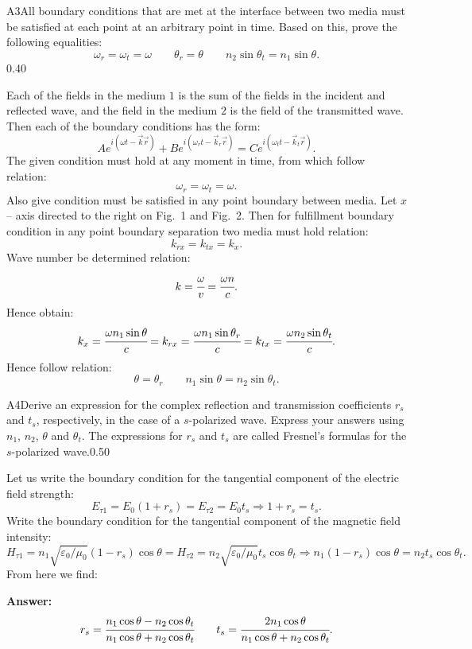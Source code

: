 \documentclass[11pt,a4paper]{article}
\begin{document}
\begin{solcard}{A3}{All boundary conditions that are met at the interface between two media must be satisfied at each point at an arbitrary point in time. Based on this, prove the following equalities: $$\omega_r=\omega_t=\omega\qquad \theta_r=\theta\qquad n_2\sin\theta_t=n_1\sin\theta{.} $$}{0.40}

Each of the fields in the medium $1$ is the sum of the fields in the incident and reflected wave, and the field in the medium $2$ is the field of the transmitted wave. Then each of the boundary conditions has the form: $$Ae^{i(\omega t-\vec{k}\vec{r})}+Be^{i(\omega_rt-\vec{k}_r\vec{r})}=Ce^{i(\omega_tt-\vec{k}_t\vec{r})}{.} $$The given condition must hold at any moment in time, from which follow relation: $$\omega_r=\omega_t=\omega{.} $$Also give condition must be satisfied in any point boundary between media. Let $x$ -- axis directed to the right on Fig.~1 and Fig.~2. Then for fulfillment boundary condition in any point boundary separation two media must hold relation: $$k_{rx}=k_{tx}=k_x{.} $$Wave number be determined relation: $$k=\cfrac{\omega}{v}=\cfrac{\omega n}{c}{.} $$Hence obtain: $$k_x=\cfrac{\omega n_1\sin\theta}{c}=k_{rx}=\cfrac{\omega n_1\sin\theta_r}{c}=k_{tx}=\cfrac{\omega n_2\sin\theta_t}{c}{.} $$Hence follow relation: $$\theta=\theta_r\qquad n_1\sin\theta=n_2\sin\theta_t{.} $$

\end{solcard}

\begin{solcard}{A4}{Derive an expression for the complex reflection and transmission coefficients $r_s$ and $t_s$, respectively, in the case of a $s$-polarized wave. Express your answers using $n_1$, $n_2$, $\theta$ and $\theta_t$. The expressions for $r_s$ and $t_s$ are called Fresnel's formulas for the $s$-polarized wave.}{0.50}

Let us write the boundary condition for the tangential component of the electric field strength: $$E_{\tau 1}=E_0(1+r_s)=E_{\tau 2}=E_0t_s\Rightarrow 1+r_s=t_s{.} $$Write the boundary condition for the tangential component of the magnetic field intensity: $$H_{\tau 1}=n_1\sqrt{\varepsilon_0/\mu_0}(1-r_s)\cos\theta=H_{\tau 2}=n_2\sqrt{\varepsilon_0/\mu_0}t_s\cos\theta_t\Rightarrow n_1(1-r_s)\cos\theta=n_2t_s\cos\theta_t{.} $$From here we find:

\par\smallskip\noindent\textbf{Answer:} $$r_s=\cfrac{n_1\cos\theta-n_2\cos\theta_t}{n_1\cos\theta+n_2\cos\theta_t}\qquad t_s=\cfrac{2n_1\cos\theta}{n_1\cos\theta+n_2\cos\theta_t}{.} $$
\end{solcard}
\end{document}
